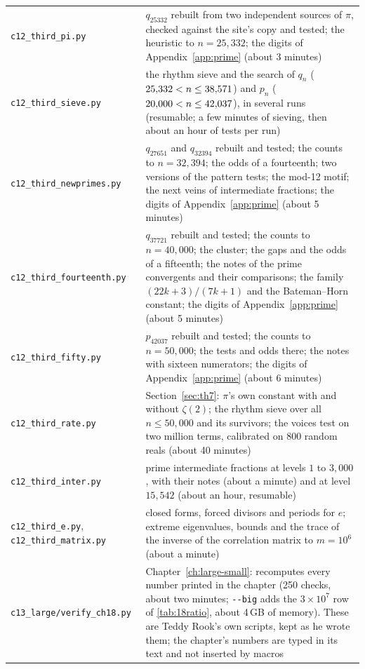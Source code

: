 {\begin{longtable}{@{}>{\raggedright\arraybackslash}p{}>{\raggedright\arraybackslash}p{}@{}}
\texttt{c12\_third\_pi.py} \addedon{\revC} & $q_{25332}$ rebuilt from two independent sources of $\pi$, checked against the site's copy and tested; the heuristic to $n = 25{,}332$; the digits of Appendix~\ref{app:prime} (about 3 minutes) \\
\texttt{c12\_third\_sieve.py} \addedon{\revC} & the rhythm sieve and the search of $q_n$ ($25{,}332 < n \le 38{,}571$) and $p_n$ ($20{,}000 < n \le 42{,}037$), in several runs (resumable; a few minutes of sieving, then about an hour of tests per run) \\
\texttt{c12\_third\_newprimes.py} \addedon{\revC} & $q_{27651}$ and $q_{32394}$ rebuilt and tested; the counts to $n = 32{,}394$; the odds of a fourteenth; two versions of the pattern tests; the mod-12 motif; the next veins of intermediate fractions; the digits of Appendix~\ref{app:prime} (about 5 minutes) \\
\texttt{c12\_third\_fourteenth.py} \addedon{\revC} & $q_{37721}$ rebuilt and tested; the counts to $n = 40{,}000$; the cluster; the gaps and the odds of a fifteenth; the notes of the prime convergents and their comparisons; the family $(22k+3)/(7k+1)$ and the Bateman--Horn constant; the digits of Appendix~\ref{app:prime} (about 5 minutes) \\
\texttt{c12\_third\_fifty.py} \addedon{\revC} & $p_{42037}$ rebuilt and tested; the counts to $n = 50{,}000$; the tests and odds there; the notes with sixteen numerators; the digits of Appendix~\ref{app:prime} (about 6 minutes) \\
\texttt{c12\_third\_rate.py} \addedon{\revC} & Section~\ref{sec:th7}: $\pi$'s own constant with and without $\zeta(2)$; the rhythm sieve over all $n \le 50{,}000$ and its survivors; the voices test on two million terms, calibrated on 800 random reals (about 40 minutes) \\
\texttt{c12\_third\_inter.py} \addedon{\revC} & prime intermediate fractions at levels $1$ to $3{,}000$, with their notes (about a minute) and at level $15{,}542$ (about an hour, resumable) \\
\texttt{c12\_third\_e.py}, \texttt{c12\_third\_matrix.py} \addedon{\revC} & closed forms, forced divisors and periods for $e$; extreme eigenvalues, bounds and the trace of the inverse of the correlation matrix to $m = 10^6$ (about a minute) \\
\texttt{c13\_large/verify\_ch18.py} \addedon{\revD} & Chapter~\ref{ch:large-small}: recomputes every number printed in the chapter (250 checks, about two minutes; \texttt{-{}-big} adds the $3\times10^7$ row of \cref{tab:18ratio}, about 4\,GB of memory). These are Teddy Rook's own scripts, kept as he wrote them; the chapter's numbers are typed in its text and not inserted by macros \\

\end{longtable}}
